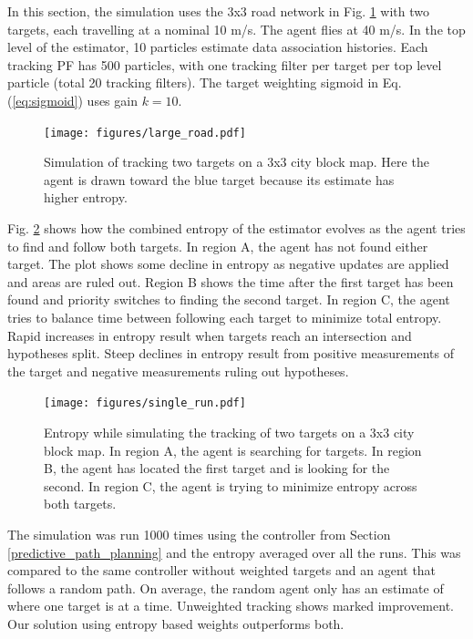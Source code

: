 \documentclass[letterpaper, 10 pt, conference]{ieeeconf}  %
\begin{document}

In this section, the simulation uses the 3x3 road network in Fig. \ref{fig:larger_roads} with two targets, each travelling at a nominal 10 m/s. The agent flies at 40 m/s. In the top level of the estimator, 10 particles estimate data association histories. Each tracking PF has 500 particles, with one tracking filter per target per top level particle (total 20 tracking filters). The target weighting sigmoid in Eq. (\ref{eq:sigmoid}) uses gain $k=10$.

\begin{figure}
\centering
\texttt{[image: figures/large\_road.pdf]}
\caption{Simulation of tracking two targets on a 3x3 city block map. Here the agent is drawn toward the blue target because its estimate has higher entropy.}
\label{fig:larger_roads}
\end{figure}

Fig. \ref{fig:single_run} shows how the combined entropy of the estimator evolves as the agent tries to find and follow both targets. In region A, the agent has not found either target. The plot shows some decline in entropy as negative updates are applied and areas are ruled out. Region B shows the time after the first target has been found and priority switches to finding the second target. In region C, the agent tries to balance time between following each target to minimize total entropy. Rapid increases in entropy result when targets reach an intersection and hypotheses split. Steep declines in entropy result from positive measurements of the target and negative measurements ruling out hypotheses.

\begin{figure}
\texttt{[image: figures/single\_run.pdf]}
\caption{Entropy while simulating the tracking of two targets on a 3x3 city block map. In region A, the agent is searching for targets. In region B, the agent has located the first target and is looking for the second. In region C, the agent is trying to minimize entropy across both targets.}
\label{fig:single_run}
\end{figure}

The simulation was run 1000 times using the controller from Section \ref{predictive_path_planning} and the entropy averaged over all the runs. This was compared to the same controller without weighted targets and an agent that follows a random path. On average, the random agent only has an estimate of where one target is at a time. Unweighted tracking shows marked improvement. Our solution using entropy based weights outperforms both.
\end{document}
